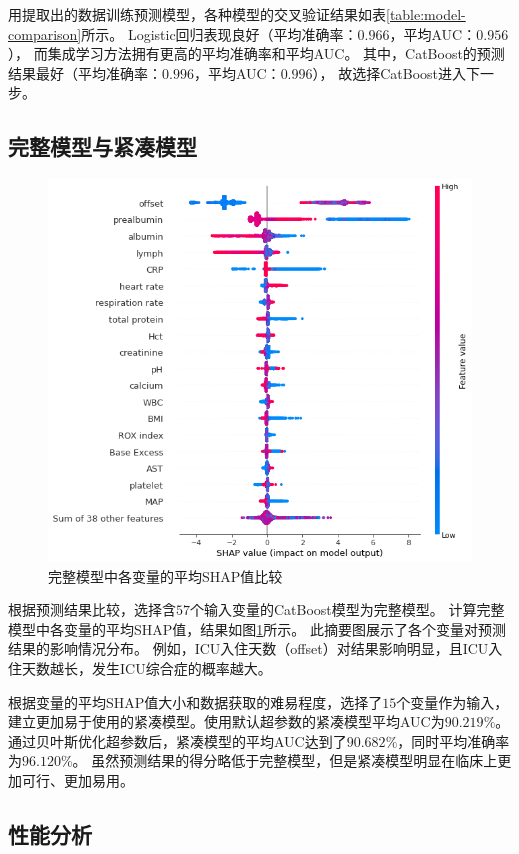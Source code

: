 用提取出的数据训练预测模型，各种模型的交叉验证结果如表\ref{table:model-comparison}所示。%
Logistic回归表现良好（平均准确率：$0.966$，平均AUC：$0.956$），%
而集成学习方法拥有更高的平均准确率和平均AUC。%
其中，CatBoost的预测结果最好（平均准确率：$0.996$，平均AUC：$0.996$），%
故选择CatBoost进入下一步。

\subsection{完整模型与紧凑模型}

\begin{figure}[htb]
    \centering
    \includegraphics[width=0.9\linewidth]{../img/eicu_full_shap_beeswarm_20.png}
    \caption{完整模型中各变量的平均SHAP值比较}
    \label{figure:full-shap}
\end{figure}

根据预测结果比较，选择含$57$个输入变量的CatBoost模型为完整模型。%
计算完整模型中各变量的平均SHAP值，结果如图\ref{figure:full-shap}所示。%
此摘要图展示了各个变量对预测结果的影响情况分布。%
例如，ICU入住天数（offset）对结果影响明显，且ICU入住天数越长，发生ICU综合症的概率越大。

根据变量的平均SHAP值大小和数据获取的难易程度，选择了$15$个变量作为输入，%
建立更加易于使用的紧凑模型。使用默认超参数的紧凑模型平均AUC为$90.219\%$。%
通过贝叶斯优化超参数后，紧凑模型的平均AUC达到了$90.682\%$，同时平均准确率为$96.120\%$。%
虽然预测结果的得分略低于完整模型，但是紧凑模型明显在临床上更加可行、更加易用。

\subsection{性能分析}

